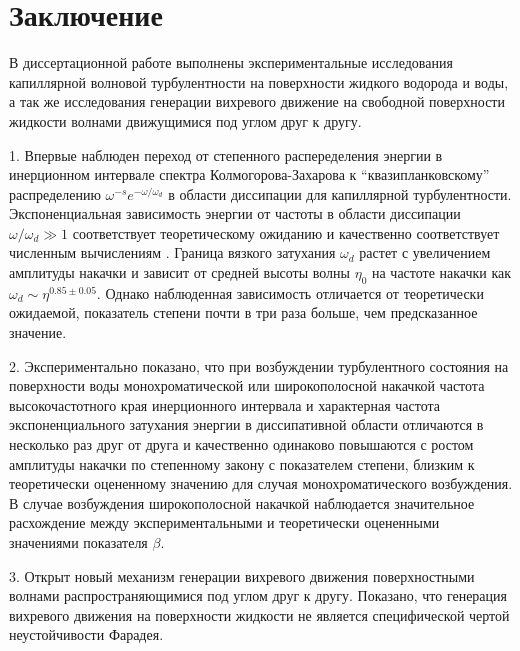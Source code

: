 \chapter*{Заключение}						%

В диссертационной работе выполнены экспериментальные исследования капиллярной волновой турбулентности на поверхности жидкого водорода и воды, а так же исследования генерации вихревого движение на свободной поверхности жидкости волнами движущимися под углом друг к другу.

1. Впервые наблюден переход от степенного распеределения энергии в инерционном интервале спектра Колмогорова-Захарова к “квазипланковскому” распределению $\omega^{-s}e^{-\omega/\omega_d}$ в области диссипации для капиллярной турбулентности. Экспоненциальная зависимость энергии от частоты в области диссипации $\omega/\omega_d \gg 1$ соответствует теоретическому ожиданию и качественно соответствует численным вычислениям \cite{Ryzhenkova1990}. Граница вязкого затухания $\omega_d$ растет с увеличением амплитуды накачки и зависит от средней высоты волны $\eta_0$ на частоте накачки как $\omega_d \sim \eta^{0.85 \pm 0.05}$. Однако наблюденная зависимость отличается от теоретически ожидаемой, показатель степени почти в три раза больше, чем предсказанное значение.

2. Экспериментально показано, что при возбуждении турбулентного состояния на поверхности воды монохроматической или широкополосной накачкой частота высокочастотного края инерционного интервала и характерная частота экспоненциального затухания энергии в диссипативной области отличаются в несколько раз друг от друга и качественно одинаково повышаются с ростом амплитуды накачки по степенному закону с показателем степени, близким к теоретически оцененному значению для случая монохроматического возбуждения. В случае возбуждения широкополосной накачкой наблюдается значительное расхождение между экспериментальными и теоретически оцененными значениями показателя $\beta$.

3. Открыт новый механизм генерации вихревого движения поверхностными волнами распространяющимися под углом друг к другу. Показано, что генерация вихревого движения на поверхности жидкости не является специфической чертой неустойчивости Фарадея.

